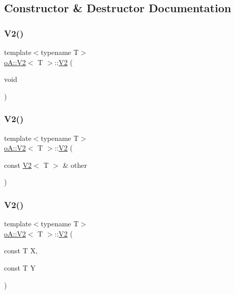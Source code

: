 \subsection{Constructor \& Destructor Documentation}
\mbox{\label{structo_a_1_1_v2_a6b62d1b3e8de957a3c2d26925b6508e1}} 
\subsubsection{\texorpdfstring{V2()}{V2()}\hspace{0.1cm}{\footnotesize\ttfamily [1/3]}}
{\footnotesize\ttfamily template$<$typename T$>$ \\
\mbox{\hyperlink{structo_a_1_1_v2}{o\+A\+::\+V2}}$<$ T $>$\+::\mbox{\hyperlink{structo_a_1_1_v2}{V2}} (\begin{DoxyParamCaption}\item[{void}]{ }\end{DoxyParamCaption})\hspace{0.3cm}{\ttfamily [default]}}

\mbox{\label{structo_a_1_1_v2_adb120ae33b44a00dd2b40136283422eb}} 
\subsubsection{\texorpdfstring{V2()}{V2()}\hspace{0.1cm}{\footnotesize\ttfamily [2/3]}}
{\footnotesize\ttfamily template$<$typename T$>$ \\
\mbox{\hyperlink{structo_a_1_1_v2}{o\+A\+::\+V2}}$<$ T $>$\+::\mbox{\hyperlink{structo_a_1_1_v2}{V2}} (\begin{DoxyParamCaption}\item[{const \mbox{\hyperlink{structo_a_1_1_v2}{V2}}$<$ T $>$ \&}]{other }\end{DoxyParamCaption})\hspace{0.3cm}{\ttfamily [inline]}}

\mbox{\label{structo_a_1_1_v2_a382c0ae0124a0dd755ce870f40651a41}} 
\subsubsection{\texorpdfstring{V2()}{V2()}\hspace{0.1cm}{\footnotesize\ttfamily [3/3]}}
{\footnotesize\ttfamily template$<$typename T$>$ \\
\mbox{\hyperlink{structo_a_1_1_v2}{o\+A\+::\+V2}}$<$ T $>$\+::\mbox{\hyperlink{structo_a_1_1_v2}{V2}} (\begin{DoxyParamCaption}\item[{const T}]{X,  }\item[{const T}]{Y }\end{DoxyParamCaption})\hspace{0.3cm}{\ttfamily [inline]}}



